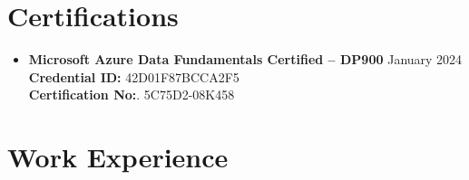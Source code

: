 \documentclass{article}
\begin{document}
	\section*{Certifications \hrulefill\vspace{-.3\baselineskip}}
	\begin{itemize}
		\item \textbf{Microsoft Azure Data Fundamentals Certified – DP900} \hfill January 2024\\
		\textbf{Credential ID:} 42D01F87BCCA2F5\\
		\textbf{Certification No:}. 5C75D2-08K458
	\end{itemize}
	
	\section*{Work Experience \hrulefill\vspace{-.3\baselineskip}}
\end{document}
